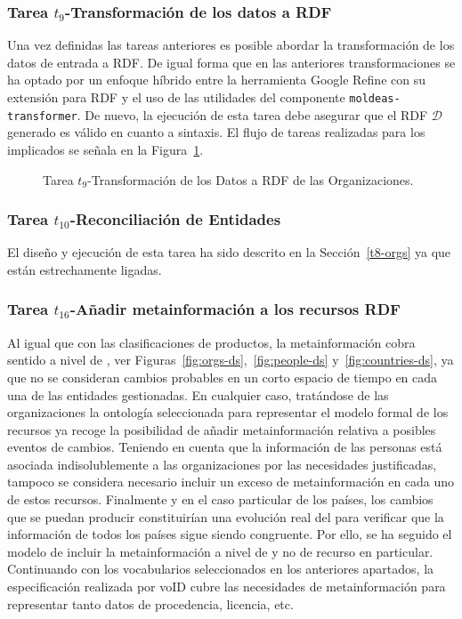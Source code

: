 \subsubsection{Tarea $t_9$-Transformación de los datos a RDF}
Una vez definidas las tareas anteriores es posible abordar la transformación 
de los datos de entrada a \gls{RDF}. De igual forma que en las anteriores transformaciones 
se ha optado por un enfoque híbrido entre la herramienta Google Refine con su extensión 
para RDF y el uso de las utilidades del componente \texttt{moldeas-transformer}. De nuevo, la ejecución de esta 
tarea debe asegurar que el \dataset RDF $\mathcal{D}$ generado es válido en cuanto a sintaxis. El flujo 
de tareas realizadas para los \datasets implicados se señala en la Figura~\ref{fig:t9-orgs}.

\begin{figure}[!htb]
\centering
\caption{Tarea $t_9$-Transformación de los Datos a RDF de las Organizaciones.}
\label{fig:t9-orgs}
\end{figure}

\subsubsection{Tarea $t_{10}$-Reconciliación de Entidades}
El diseño y ejecución de esta tarea ha sido descrito en la Sección~\ref{t8-orgs} ya que están 
estrechamente ligadas.

\subsubsection{Tarea $t_{16}$-Añadir metainformación a los recursos RDF}\label{t16-orgs}
Al igual que con las clasificaciones de productos, la metainformación cobra sentido a 
nivel de \dataset, ver Figuras~\ref{fig:orgs-ds},~\ref{fig:people-ds} y~\ref{fig:countries-ds}, ya que no se consideran cambios probables en un corto espacio de tiempo 
en cada una de las entidades gestionadas. En cualquier caso, tratándose de las organizaciones 
la ontología seleccionada para representar el modelo formal de los recursos ya recoge 
la posibilidad de añadir metainformación relativa a posibles eventos de cambios. Teniendo 
en cuenta que la información de las personas está asociada indisolublemente a las organizaciones 
por las necesidades justificadas, tampoco se considera necesario incluir un exceso de metainformación 
en cada uno de estos recursos. Finalmente y en el caso particular de los países, los cambios que se puedan 
producir constituirían una evolución real del \dataset para verificar que la información de todos los países 
sigue siendo congruente. Por ello, se ha seguido el modelo de incluir la metainformación a nivel de 
\dataset y no de recurso en particular. Continuando con los vocabularios seleccionados en los anteriores 
apartados, la especificación realizada por \gls{voID} cubre las necesidades de metainformación para representar 
tanto datos de procedencia, licencia, etc.

